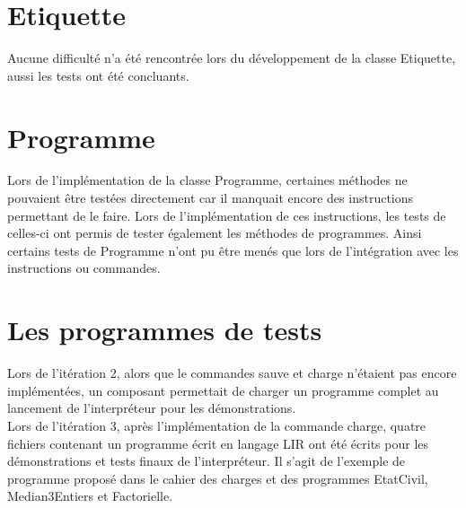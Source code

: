 
\section{Etiquette}

Aucune difficulté n'a été rencontrée lors du développement de la classe
Etiquette, aussi les tests ont été concluants.

\section{Programme}

Lors de l'implémentation de la classe Programme, certaines méthodes ne pouvaient
être testées directement car il manquait encore des instructions permettant de le
faire.
Lors de l'implémentation de ces instructions, les tests de celles-ci ont permis
de tester également les méthodes de programmes. Ainsi certains tests de Programme
n'ont pu être menés que lors de l'intégration avec les instructions ou commandes.

\section{Les programmes de tests}

Lors de l'itération 2, alors que le commandes sauve et charge n'étaient pas encore
implémentées, un composant permettait de charger un programme complet au lancement
de l'interpréteur pour les démonstrations.
\\ Lors de l'itération 3, après l'implémentation de la commande charge, quatre
fichiers contenant un programme écrit en langage LIR ont été écrits pour les
démonstrations et tests finaux de l'interpréteur. Il s'agit de l'exemple de
programme proposé dans le cahier des charges et des programmes EtatCivil,
Median3Entiers et Factorielle.
